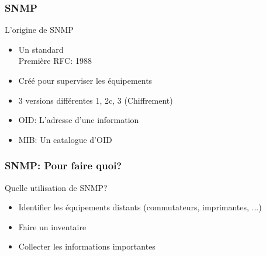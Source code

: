 \documentclass{beamer}
\begin{document}
\begin{frame}
    \frametitle{SNMP}


    \begin{block}{L'origine de SNMP}
    \begin{itemize}
    \item Un standard \\
    \small{Première RFC: 1988}
    \item Créé pour superviser les équipements
    \item 3 versions différentes 1, 2c, 3 (Chiffrement)
    \item OID: L'adresse d'une information
    \item MIB: Un catalogue d'OID
    \end{itemize}
    \end{block}
\end{frame}

\begin{frame}
    \frametitle{SNMP: Pour faire quoi?}

    \begin{block}{Quelle utilisation de SNMP?}
    \begin{itemize}
    \item Identifier les équipements distants (commutateurs, imprimantes, ...)
    \item Faire un inventaire
    \item Collecter les informations importantes
    \end{itemize}
    \end{block}
\end{frame}
\end{document}
